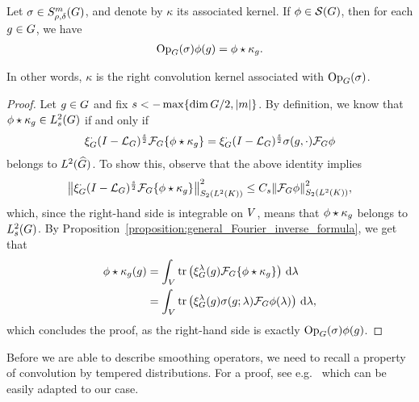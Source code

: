 \begin{proposition}[Quantisation]
\label{proposition:quantisation}
    Let $\sigma \in \SymbolClass{m}{\rho, \delta}$,
    and denote by $\kappa$ its associated kernel.
    If $\phi \in \Schwartz\Group$, then for each $g \in \Group$, we have
    \begin{align*}
        \Op(\sigma) \phi(g) = \conv{\phi}{\kappa_g}.
    \end{align*}

    In other words, $\kappa$ is the right convolution kernel associated with $\Op(\sigma)$.
\end{proposition}
\begin{proof}
    Let $g \in \Group$ and fix $s < -\max \{\dim \Group/2, \abs m\}$.
    By definition, we know that $\conv \phi \kappa_g \in \Sobolev s$ if and only if
    \begin{align*}
        \Rep \dummy \BesselPotential s \Fourier \{\conv \phi {\kappa_g}\}
        = \Rep \dummy \BesselPotential s \sigma(g, \dummy) \Fourier \phi
    \end{align*}
    belongs to $\LebesgueDual 2 \Group$.
    To show this,
    observe that the above identity implies
    \begin{align*}
        \norm[\SchattenClasses 2 {\Lebesgue 2 \CompactGroup}] {\Rep \dummy \BesselPotential s \Fourier \{\conv \phi {\kappa_g}\}}^2
        \leq C_s \norm[\SchattenClasses 2 {\Lebesgue 2 \CompactGroup}] {\Fourier \phi}^2,
    \end{align*}
    which, since the right-hand side is integrable on $\VectorSpace$,
    means that $\conv \phi {\kappa_g}$ belongs to $\Sobolev s$.
    By Proposition~\ref{proposition:general_Fourier_inverse_formula},
    we get that
    \begin{align*}
        \conv \phi {\kappa_g}(g)
        &= \int_\VectorSpace \tr\left(\Rep \lambda(g) \Fourier \{\conv \phi {\kappa_g}\}\right) \dd \lambda\\
        &= \int_\VectorSpace \tr\left(\Rep \lambda(g) \sigma(g; \lambda) \Fourier \phi(\lambda)\right) \dd \lambda,
    \end{align*}
    which concludes the proof,
    as the right-hand side is exactly $\Op(\sigma) \phi(g)$.
\end{proof}

Before we are able to describe smoothing operators,
we need to recall a property of convolution by tempered distributions.
For a proof, see e.g.~\cite[Lemma 3.1.55]{FischerRuzhansky16} which can be easily adapted to our case.

